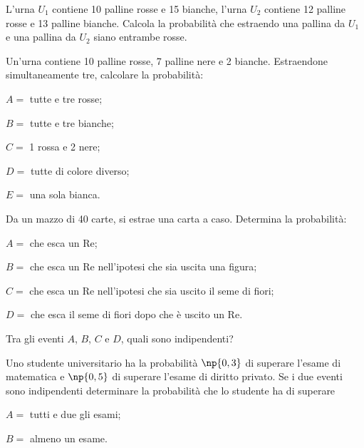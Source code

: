 \begin{esercizio}
 \label{ese:9.58}
L'urna $ U_1 $ contiene 10 palline rosse e 15 bianche, l'urna $ U_2 $ contiene 12 palline rosse e 13 palline bianche. Calcola la probabilità che estraendo una pallina da $ U_1 $ e una pallina da $ U_2 $ siano entrambe rosse.
\end{esercizio}

\begin{esercizio}[\Ast]
 \label{ese:9.59}
 Un'urna contiene 10 palline rosse, 7 palline nere e 2 bianche. Estraendone simultaneamente tre, calcolare la probabilità:
\begin{description*}
 \item $ A= $ tutte e tre rosse;
 \item $ B= $ tutte e tre bianche;
 \item $ C= $ 1 rossa e 2 nere;
 \item $ D= $ tutte di colore diverso;
 \item $ E= $ una sola bianca.
\end{description*}
\end{esercizio}

\begin{esercizio}[\Ast]
 \label{ese:9.60}
 Da un mazzo di 40 carte, si estrae una carta a caso. Determina la probabilità:
\begin{description*}
\item $ A= $ che esca un Re;
\item $ B= $ che esca un Re nell'ipotesi che sia uscita una figura;
\item $ C= $ che esca un Re nell'ipotesi che sia uscito il seme di fiori;
\item $ D= $ che esca il seme di fiori dopo che è uscito un Re.
\end{description*}
Tra gli eventi $A$, $B$, $C$ e $D$, quali sono indipendenti?
\end{esercizio}

\begin{esercizio}[\Ast]
 \label{ese:9.61}
Uno studente universitario ha la probabilità $\np{0,3}$ di superare l'esame di matematica e $\np{0,5}$ di superare l'esame di diritto privato. Se i due eventi sono indipendenti determinare la probabilità che lo studente ha di superare
\begin{description*}
\item $ A= $ tutti e due gli esami;
\item $ B= $ almeno un esame.
\end{description*}
\end{esercizio}

